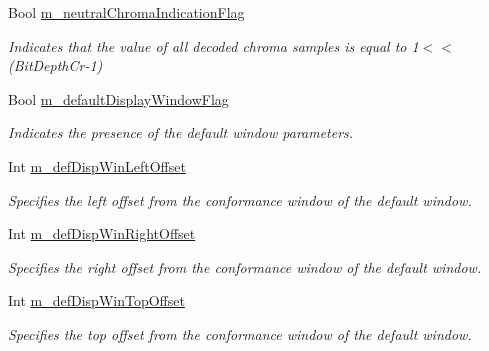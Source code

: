 \begin{DoxyCompactItemize}
\mbox{\label{class_t_app_enc_cfg_a776da636da210a84a41aa5ffb5fb8089}} 
Bool \hyperlink{class_t_app_enc_cfg_a776da636da210a84a41aa5ffb5fb8089}{m\+\_\+neutral\+Chroma\+Indication\+Flag}
\begin{DoxyCompactList}\small\item\em Indicates that the value of all decoded chroma samples is equal to 1$<$$<$(Bit\+Depth\+Cr-\/1) \end{DoxyCompactList}\item 
\mbox{\label{class_t_app_enc_cfg_a8c0239bb6f6a56fa82fce048d99066fe}} 
Bool \hyperlink{class_t_app_enc_cfg_a8c0239bb6f6a56fa82fce048d99066fe}{m\+\_\+default\+Display\+Window\+Flag}
\begin{DoxyCompactList}\small\item\em Indicates the presence of the default window parameters. \end{DoxyCompactList}\item 
\mbox{\label{class_t_app_enc_cfg_a3d8009aaa9c52baef6ef136b2f2a8386}} 
Int \hyperlink{class_t_app_enc_cfg_a3d8009aaa9c52baef6ef136b2f2a8386}{m\+\_\+def\+Disp\+Win\+Left\+Offset}
\begin{DoxyCompactList}\small\item\em Specifies the left offset from the conformance window of the default window. \end{DoxyCompactList}\item 
\mbox{\label{class_t_app_enc_cfg_af1d6d65c0c4d5896a430db65bd768dc8}} 
Int \hyperlink{class_t_app_enc_cfg_af1d6d65c0c4d5896a430db65bd768dc8}{m\+\_\+def\+Disp\+Win\+Right\+Offset}
\begin{DoxyCompactList}\small\item\em Specifies the right offset from the conformance window of the default window. \end{DoxyCompactList}\item 
\mbox{\label{class_t_app_enc_cfg_aa629b1b764edc96f503205f0b2e2fc70}} 
Int \hyperlink{class_t_app_enc_cfg_aa629b1b764edc96f503205f0b2e2fc70}{m\+\_\+def\+Disp\+Win\+Top\+Offset}
\begin{DoxyCompactList}\small\item\em Specifies the top offset from the conformance window of the default window. \end{DoxyCompactList}\item 

\end{DoxyCompactItemize}
